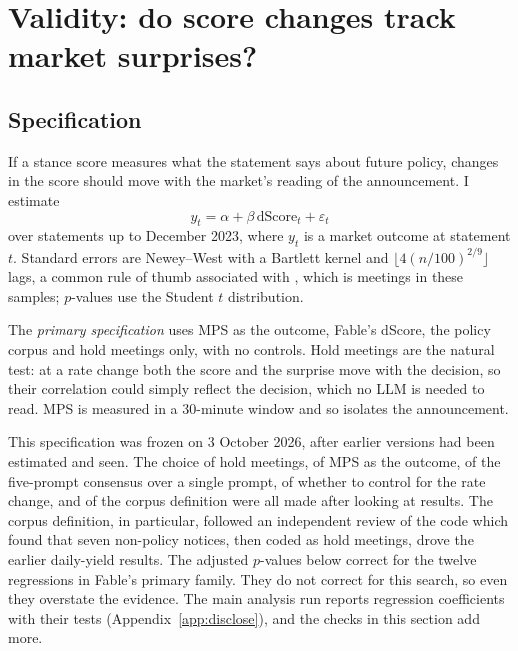 \section{Validity: do score changes track market surprises?}\label{sec:validity}

\subsection{Specification}

If a stance score measures what the statement says about future policy, changes in the score should move
with the market's reading of the announcement. I estimate
\begin{equation}
y_t = \alpha + \beta\,\text{dScore}_t + \varepsilon_t
\end{equation}
over statements up to December 2023, where $y_t$ is a market outcome at statement $t$. Standard errors
are Newey--West \citep{newey1987} with a Bartlett kernel and $\lfloor 4(n/100)^{2/9}\rfloor$ lags, a common
rule of thumb associated with \citet{newey1994}, which is  meetings in these samples;
$p$-values use the Student $t$ distribution.

The \emph{primary specification} uses MPS as the outcome, Fable's dScore, the policy corpus and hold
meetings only, with no controls. Hold meetings are the natural test: at a rate change both the score and
the surprise move with the decision, so their correlation could simply reflect the decision, which no
LLM is needed to read. MPS is measured in a 30-minute window and so isolates the announcement.

This specification was frozen on 3 October 2026, after earlier versions had been estimated and seen. The
choice of hold meetings, of MPS as the outcome, of the five-prompt consensus over a single prompt, of
whether to control for the rate change, and of the corpus definition were all made after looking at
results. The corpus definition, in particular, followed an independent review of the code which found
that seven non-policy notices, then coded as hold meetings, drove the earlier daily-yield results. The
adjusted $p$-values below correct for the twelve regressions in Fable's primary family. They do not
correct for this search, so even they overstate the evidence. The main analysis run reports
 regression coefficients with their tests (Appendix~\ref{app:disclose}), and the checks in
this section add more.

